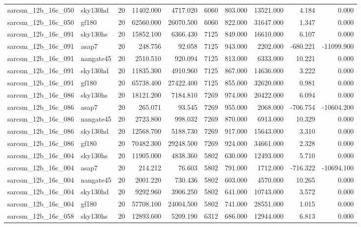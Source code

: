 \begin{longtable}{llrrrrrrrr}
sarcsm\_12b\_16c\_050 & sky130hd & 20 & 11402.000 & 4717.020 & 6060 & 803.000 & 13521.000 & 4.184 & 0.000 \\
sarcsm\_12b\_16c\_050 & gf180 & 20 & 62560.000 & 26070.500 & 6060 & 822.000 & 31647.000 & 1.347 & 0.000 \\
sarcsm\_12b\_16c\_091 & sky130hs & 20 & 15852.100 & 6366.430 & 7125 & 849.000 & 16610.000 & 6.107 & 0.000 \\
sarcsm\_12b\_16c\_091 & asap7 & 20 & 248.756 & 92.058 & 7125 & 943.000 & 2202.000 & -680.221 & -11099.900 \\
sarcsm\_12b\_16c\_091 & nangate45 & 20 & 2510.510 & 920.094 & 7125 & 813.000 & 6333.000 & 10.221 & 0.000 \\
sarcsm\_12b\_16c\_091 & sky130hd & 20 & 11835.300 & 4910.960 & 7125 & 867.000 & 14636.000 & 3.222 & 0.000 \\
sarcsm\_12b\_16c\_091 & gf180 & 20 & 65738.400 & 27422.400 & 7125 & 855.000 & 32620.000 & 0.981 & 0.000 \\
sarcsm\_12b\_16c\_086 & sky130hs & 20 & 18121.200 & 7184.810 & 7269 & 974.000 & 20422.000 & 6.094 & 0.000 \\
sarcsm\_12b\_16c\_086 & asap7 & 20 & 265.071 & 93.545 & 7269 & 955.000 & 2068.000 & -706.754 & -10604.200 \\
sarcsm\_12b\_16c\_086 & nangate45 & 20 & 2723.800 & 998.032 & 7269 & 870.000 & 6913.000 & 10.329 & 0.000 \\
sarcsm\_12b\_16c\_086 & sky130hd & 20 & 12568.700 & 5188.730 & 7269 & 917.000 & 15643.000 & 3.310 & 0.000 \\
sarcsm\_12b\_16c\_086 & gf180 & 20 & 70482.300 & 29248.500 & 7269 & 924.000 & 34661.000 & 2.328 & 0.000 \\
sarcsm\_12b\_16c\_004 & sky130hs & 20 & 11905.000 & 4838.360 & 5802 & 630.000 & 12493.000 & 5.710 & 0.000 \\
sarcsm\_12b\_16c\_004 & asap7 & 20 & 214.212 & 76.603 & 5802 & 791.000 & 1712.000 & -716.322 & -10694.100 \\
sarcsm\_12b\_16c\_004 & nangate45 & 20 & 2001.220 & 730.436 & 5802 & 603.000 & 4570.000 & 10.265 & 0.000 \\
sarcsm\_12b\_16c\_004 & sky130hd & 20 & 9292.960 & 3906.250 & 5802 & 641.000 & 10743.000 & 3.572 & 0.000 \\
sarcsm\_12b\_16c\_004 & gf180 & 20 & 57708.100 & 24004.500 & 5802 & 741.000 & 28551.000 & 1.015 & 0.000 \\
sarcsm\_12b\_16c\_058 & sky130hs & 20 & 12893.600 & 5209.190 & 6312 & 686.000 & 12944.000 & 6.813 & 0.000 \\

\end{longtable}
